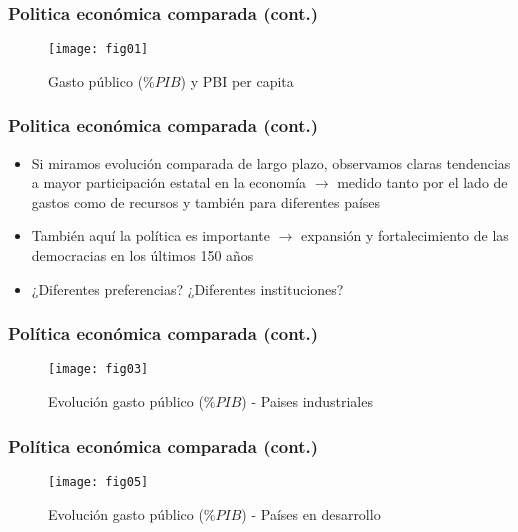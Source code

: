 \documentclass[14pt,aspectratio=169]{beamer}
\begin{document}
\begin{frame}\frametitle{Politica económica comparada (cont.)}
  \begin{figure}[htbp]
    \centering
    \texttt{[image: fig01]}
    \caption{Gasto público ($\%PIB$) y PBI per capita}
    \label{fig:3}
  \end{figure}
\end{frame}


\begin{frame}\frametitle{Politica económica comparada (cont.)}
  \begin{itemize}
    \item Si miramos evolución comparada de largo plazo, observamos claras tendencias
      a mayor participación estatal en la economía $\longrightarrow$
      medido tanto por el lado de gastos como de recursos y también
      para diferentes países
      \item También aquí la política es importante $\longrightarrow$
        expansión y fortalecimiento de las democracias en los últimos
        150 años
        \item ¿Diferentes preferencias? ¿Diferentes instituciones?
          \end{itemize}
\end{frame}


\begin{frame}\frametitle{Política económica comparada (cont.)}
  \begin{figure}[htbp]
    \centering
    \texttt{[image: fig03]}
    \caption{Evolución gasto público ($\%PIB$) - Paises industriales}
    \label{fig:4}
  \end{figure}
\end{frame}



\begin{frame}\frametitle{Política económica comparada (cont.)}
  \begin{figure}[htbp]
    \centering
    \texttt{[image: fig05]}
    \caption{Evolución gasto público ($\%PIB$) - Países en desarrollo}
    \label{fig:5}
  \end{figure}
\end{frame}
\end{document}
